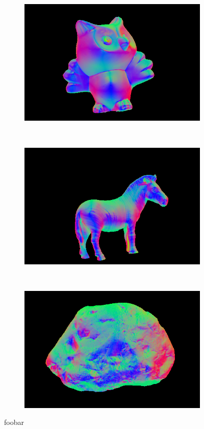 \documentclass{paper}
\begin{document}
\begin{figure}[h!]
     \begin{subfigure}{0.3\textwidth}
        \includegraphics[width=\textwidth]{results/owl/owl_n}
    \end{subfigure}
    ~
    \begin{subfigure}{0.3\textwidth}
        \includegraphics[width=\textwidth]{results/horse/horse_n}
    \end{subfigure}
    ~
    \begin{subfigure}{0.3\textwidth}
        \includegraphics[width=\textwidth]{results/rock/rock_n}
    \end{subfigure}
    \caption{foobar}
    \label{fig:normals}       
\end{figure}
\end{document}
